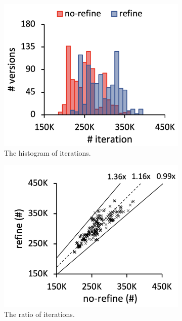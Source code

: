 \begin{figure}
  \centering
  \begin{subfigure}[b]{0.24\textwidth}
    \includegraphics[width=\textwidth]{img/compare-iter}
    \caption{The histogram of iterations.}
  \end{subfigure}
  \begin{subfigure}[b]{0.24\textwidth}
    \includegraphics[width=\textwidth]{img/ratio-iter}
    \caption{The ratio of iterations.}
  \end{subfigure}
  \begin{subfigure}[b]{0.24\textwidth}

\end{subfigure}
\end{figure}
